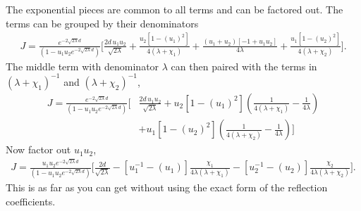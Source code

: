 The exponential pieces are common to all terms and can be factored out.  
The terms can be grouped by their denominators 
\begin{align}
  J=\frac{e^{-2\sqrt{2\lambda}d}}{(1-u_1u_2 e^{-2\sqrt{2\lambda}d})}
    \bigg[\frac{2d\,u_1u_2 }{\sqrt{2\lambda}}
  +\frac{u_2 [1 - (u_1)^2]}{4(\lambda+\chi_1)} 
     +\frac{(u_1 +u_2)[-1+u_1u_2]}
    {4\lambda}
    +\frac{u_1[1-(u_2)^2]}{4(\lambda+\chi_2)}\bigg].
  \end{align}
The middle term with denominator $\lambda$ can then paired with the terms in $(\lambda+\chi_1)^{-1}$
and $(\lambda+\chi_2)^{-1}$,
\begin{align}
  J=\frac{e^{-2\sqrt{2\lambda}d}}{(1-u_1u_2 e^{-2\sqrt{2\lambda}d})}
    \bigg[&\frac{2d\,u_1u_2 }{\sqrt{2\lambda}}
    +u_2 [1 - (u_1)^2]\left(\frac{1}{4(\lambda+\chi_1)}-\frac{1}{4\lambda} \right)\nonumber\\
    &+u_1[1-(u_2)^2]\left(\frac{1}{4(\lambda+\chi_2)}-\frac{1}{4\lambda}\right)\bigg]
  \end{align}
Now factor out $u_1u_2$,  
\begin{align*}
  J=\frac{u_1u_2e^{-2\sqrt{2\lambda}d}}{(1-u_1u_2 e^{-2\sqrt{2\lambda}d})}
    \bigg[\frac{2d}{\sqrt{2\lambda}}
    -[u_1^{-1} - (u_1)]\frac{\chi_1}{4\lambda(\lambda+\chi_1)}
    -[u_2^{-1}-(u_2)]\frac{\chi_2}{4\lambda(\lambda+\chi_2)}\bigg].
  \end{align*}
This is as far as you can get without using the exact form of the reflection coefficients.  
